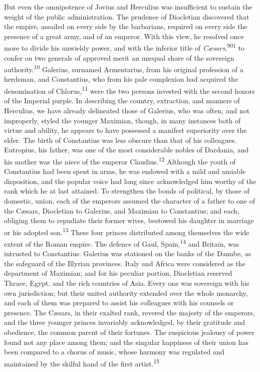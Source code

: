 But even the omnipotence of Jovius and Herculius was insufficient
to sustain the weight of the public administration. The prudence
of Diocletian discovered that the empire, assailed on every side
by the barbarians, required on every side the presence of a great
army, and of an emperor. With this view, he resolved once more to
divide his unwieldy power, and with the inferior title of
\textit{Cæsars},\textsuperscript{901} to confer on two generals of approved merit an
unequal share of the sovereign authority.\textsuperscript{10} Galerius, surnamed
Armentarius, from his original profession of a herdsman, and
Constantius, who from his pale complexion had acquired the
denomination of Chlorus,\textsuperscript{11} were the two persons invested with
the second honors of the Imperial purple. In describing the
country, extraction, and manners of Herculius, we have already
delineated those of Galerius, who was often, and not improperly,
styled the younger Maximian, though, in many instances both of
virtue and ability, he appears to have possessed a manifest
superiority over the elder. The birth of Constantius was less
obscure than that of his colleagues. Eutropius, his father, was
one of the most considerable nobles of Dardania, and his mother
was the niece of the emperor Claudius.\textsuperscript{12} Although the youth of
Constantius had been spent in arms, he was endowed with a mild
and amiable disposition, and the popular voice had long since
acknowledged him worthy of the rank which he at last attained. To
strengthen the bonds of political, by those of domestic, union,
each of the emperors assumed the character of a father to one of
the Cæsars, Diocletian to Galerius, and Maximian to Constantius;
and each, obliging them to repudiate their former wives, bestowed
his daughter in marriage or his adopted son.\textsuperscript{13} These four
princes distributed among themselves the wide extent of the Roman
empire. The defence of Gaul, Spain,\textsuperscript{14} and Britain, was intrusted
to Constantius: Galerius was stationed on the banks of the
Danube, as the safeguard of the Illyrian provinces. Italy and
Africa were considered as the department of Maximian; and for his
peculiar portion, Diocletian reserved Thrace, Egypt, and the rich
countries of Asia. Every one was sovereign with his own
jurisdiction; but their united authority extended over the whole
monarchy, and each of them was prepared to assist his colleagues
with his counsels or presence. The Cæsars, in their exalted rank,
revered the majesty of the emperors, and the three younger
princes invariably acknowledged, by their gratitude and
obedience, the common parent of their fortunes. The suspicious
jealousy of power found not any place among them; and the
singular happiness of their union has been compared to a chorus
of music, whose harmony was regulated and maintained by the
skilful hand of the first artist.\textsuperscript{15}

